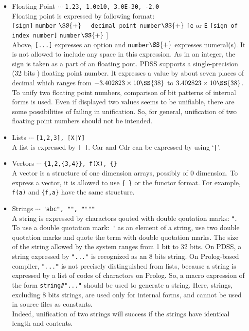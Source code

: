 \begin{itemize}
\item Floating Point $\cdots$ \verb|1.23, 1.0e10, 3.0E-30, -2.0|\\
Floating point is expressed by following format:\\
\hspace*{4em} \verb|[sign]| \verb|number| $\SS{+}$
		\verb|  decimal point number|$\SS{+}$
		\verb|[e| or \verb|E| \verb|[sign of index number]| 
		\verb|number|$\SS{+}$ ]\\
Above, \verb|[...]| expresses an option and \verb|number|$\SS{+}$ 
expresses numeral(s).
It is not allowed to include any space in this expression.
As in an integer, the sign is taken as a part of an floating pont.
PDSS supports a single-precision (32 bits ) floating point number.
It expresses a value by about seven places of decimal which 
ranges from $-3.402823 \times 10\SS{38}$ to $3.402823 \times 10\SS{38}$.\\
To unify two floating point numbers, comparison of bit patterns
of internal forms is used. Even if displayed two values seems to be unifiable,
there are some possibilities of failing in unification.
So, for general, 
unification of two floating point numbers should not be intended.

\item Lists $\cdots$ \verb![1,2,3], [X|Y]!\\ 
A list is expressed by \verb|[ ]|. Car and Cdr can be expressed 
by using `\verb!|!'.

\item Vectors $\cdots$ \verb|{1,2,{3,4}}, f(X), {}|\\ 
A vector is a structure of one dimension arrays, possibly of 0 dimension.
To express a vector, it is allowed to use \verb|{ }| or the functor format.
For example, \verb|f(a)| and \verb|{f,a}| have the same structure.

\item Strings $\cdots$ \verb|"abc", "", """"|\\ 
A string is expressed by charactors qouted with double qoutation marks: 
\verb|"|. To use a double quotation mark: \verb|"| as an element of a string,
use two double quotation marks and quote the term with double quotation marks.
The size of the string allowed by the system ranges from 1 bit to 32 bits.
On PDSS, a string expressed by \verb|"..."| is recognized as an 8 bits string.
On Prolog-based compiler, \verb|"..."| is not precisely distinguished
from lists, because a string is expressed by a list of codes 
of charactors on Prolog. 
So, a macro expression of the form \verb|string#"..."| should be used 
to generate a string.
Here, strings, excluding 8 bits strings, are used only for internal forms,
and cannot be used in source files as constants.\\
Indeed, unification of two strings will success
if the strings have identical length and contents.

\end{itemize}
